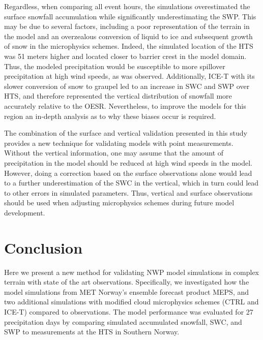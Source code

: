 \documentclass{ametsocV5}
\begin{document}
        Regardless, when comparing all event hours, the simulations overestimated the surface snowfall accumulation while significantly underestimating the SWP. This may be due to several factors, including a poor representation of the terrain in the model and an overzealous conversion of liquid to ice and subsequent growth of snow in the microphysics schemes. Indeed, the simulated location of the HTS was 51 meters higher and located closer to barrier crest in the model domain. Thus, the modeled precipitation would be susceptible to more spillover precipitation at high wind speeds, as was observed. Additionally, ICE-T with its slower conversion of snow to graupel led to an increase in SWC and SWP over HTS, and therefore represented the vertical distribution of snowfall more accurately relative to the OESR. Nevertheless, to improve the models for this region an in-depth analysis as to why these biases occur is required. 
        
        The combination of the surface and vertical validation presented in this study provides a new technique for validating models with point measurements. Without the vertical information, one may assume that the amount of precipitation in the model should be reduced at high wind speeds in the model. However, doing a correction based on the surface observations alone would lead to a further underestimation of the SWC in the vertical, which in turn could lead to other errors in simulated parameters. Thus, vertical and surface observations should be used when adjusting microphysics schemes during future model development.
        


\section{Conclusion}\label{sec:conclusion}
    Here we present a new method for validating NWP model simulations in complex terrain with state of the art observations. Specifically, we investigated how the model simulations from MET Norway’s ensemble forecast product MEPS, and two additional simulations with modified cloud microphysics schemes (CTRL and ICE-T) compared to observations. The model performance was evaluated for 27 precipitation days by comparing simulated accumulated snowfall, SWC, and SWP to measurements at the HTS in Southern Norway. 
    
\end{document}
